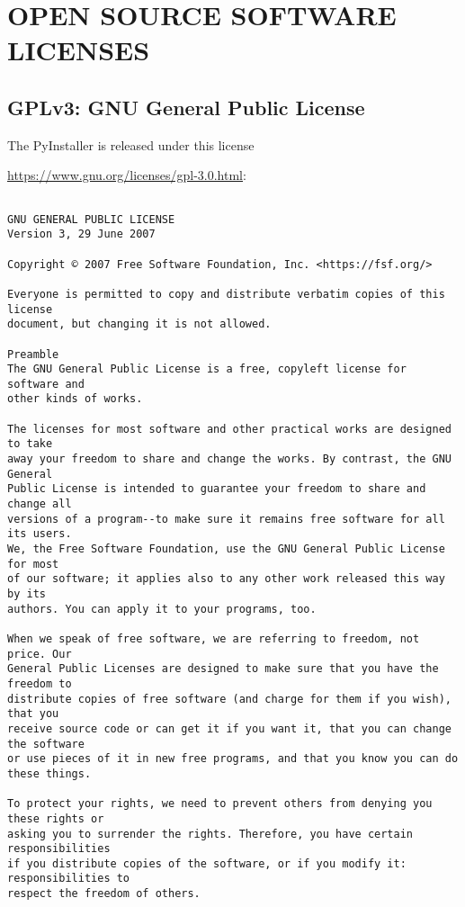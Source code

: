 \chapter{OPEN SOURCE SOFTWARE LICENSES}
\label{app:licenses}

\section{GPLv3: GNU General Public License}

The PyInstaller is released under this license

\url{https://www.gnu.org/licenses/gpl-3.0.html}:

\scriptsize
\begin{verbatim}

GNU GENERAL PUBLIC LICENSE
Version 3, 29 June 2007

Copyright © 2007 Free Software Foundation, Inc. <https://fsf.org/>

Everyone is permitted to copy and distribute verbatim copies of this license
document, but changing it is not allowed.

Preamble
The GNU General Public License is a free, copyleft license for software and
other kinds of works.

The licenses for most software and other practical works are designed to take
away your freedom to share and change the works. By contrast, the GNU General
Public License is intended to guarantee your freedom to share and change all
versions of a program--to make sure it remains free software for all its users.
We, the Free Software Foundation, use the GNU General Public License for most
of our software; it applies also to any other work released this way by its
authors. You can apply it to your programs, too.

When we speak of free software, we are referring to freedom, not price. Our
General Public Licenses are designed to make sure that you have the freedom to
distribute copies of free software (and charge for them if you wish), that you
receive source code or can get it if you want it, that you can change the software
or use pieces of it in new free programs, and that you know you can do these things.

To protect your rights, we need to prevent others from denying you these rights or
asking you to surrender the rights. Therefore, you have certain responsibilities
if you distribute copies of the software, or if you modify it: responsibilities to
respect the freedom of others.


\end{verbatim}
